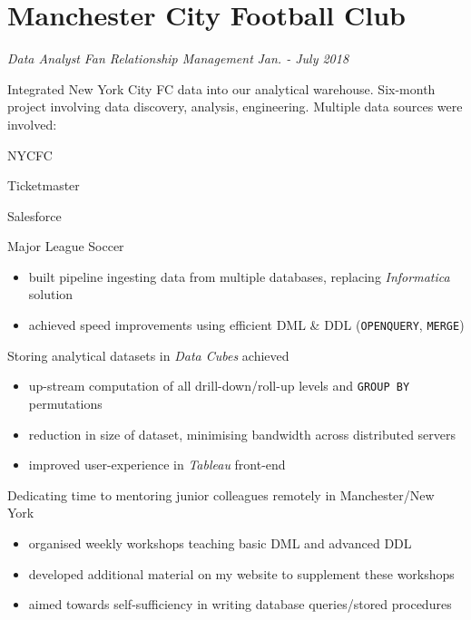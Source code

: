 \documentclass[letterpaper,11pt]{article}
\begin{document}
\newpage
\section{Manchester City Football Club}
\textit{Data Analyst}
\hfill
\textit{Fan Relationship Management}
\hfill
\textit{Jan. - July 2018}

\begin{description}[style=multiline,leftmargin=3cm]
	\item[NYCFC Data Integration \textnormal{Project Owner}]

	      Integrated New York City FC  data into our analytical warehouse.
	      Six-month project involving data discovery, analysis, engineering.
	      Multiple data sources were involved:
	      \begin{itemize*}
		      \item NYCFC
		      \item Ticketmaster
		      \item Salesforce
		      \item Major League Soccer
	      \end{itemize*}
	      \begin{description}[style=multiline,leftmargin=2.5cm]
		      \item[Data Pipeline]
		            {
		            \begin{itemize}
			            \item built pipeline ingesting data from multiple databases, replacing \textit{Informatica} solution
			            \item achieved speed improvements using efficient DML \& DDL (\texttt{OPENQUERY}, \texttt{MERGE})
		            \end{itemize}
		            }
		      \item[Data Cubes]
		            Storing analytical datasets in \textit{Data Cubes} achieved
		            \begin{itemize}
			            \item up-stream computation of all drill-down/roll-up levels and \texttt{GROUP BY} permutations
			            \item reduction in size of dataset, minimising bandwidth across distributed servers
			            \item improved user-experience in \textit{Tableau} front-end
		            \end{itemize}

		      \item[Mentoring]
		            Dedicating time to mentoring junior colleagues remotely in Manchester/New York
		            \begin{itemize}
			            \item organised weekly workshops teaching basic DML and advanced DDL
			            \item developed additional material on my website to supplement these workshops
			            \item aimed towards self-sufficiency in writing database queries/stored procedures
		            \end{itemize}


\end{description}
\end{description}
\end{document}
